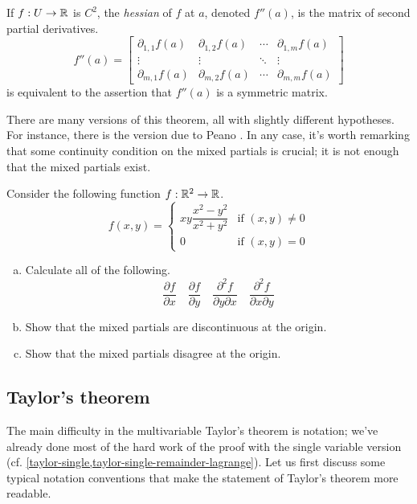 \begin{remark}
	If $f : U \to \mathbb{R}$ is $C^2$, the \emph{hessian} of $f$ at $a$, denoted $f''(a)$, is the matrix of second partial derivatives. 
	\[ f''(a) = \begin{bmatrix} \partial_{1,1} f(a) & \partial_{1,2} f(a) & \dotsb & \partial_{1,m} f(a) \\
	\vdots & \vdots & \ddots & \vdots \\
	\partial_{m,1} f(a) & \partial_{m,2} f(a) & \dotsb & \partial_{m,m} f(a) \end{bmatrix} \]
	 is equivalent to the assertion that $f''(a)$ is a symmetric matrix. 
\end{remark}

There are many versions of this theorem, all with slightly different hypotheses. For instance, there is the version due to Peano \cite[theorem 9.41]{rudin}. In any case, it's worth remarking that some continuity condition on the mixed partials is crucial; it is not enough that the mixed partials exist.

\begin{exercise}
	Consider the following function $f : \mathbb{R}^2 \to \mathbb{R}$. 
	\[ f(x,y) = \begin{cases} xy \dfrac{x^2 - y^2}{x^2 + y^2} & \text{if } (x,y) \neq 0 \\ 0 &  \text{if } (x,y) = 0 \end{cases} \]
	\begin{enumerate}[(a)]
		\item Calculate all of the following. 
		\[ \frac{\partial f}{\partial x} \quad \frac{\partial f}{\partial y} \quad \frac{\partial^2 f}{\partial y \partial x} \quad \frac{\partial^2 f}{\partial x \partial y} \]
		\item Show that the mixed partials are discontinuous at the origin. 
		\item Show that the mixed partials disagree at the origin. 
	\end{enumerate}
\end{exercise}

\subsection{Taylor's theorem \starred} 

The main difficulty in the multivariable Taylor's theorem is notation; we've already done most of the hard work of the proof with the single variable version (cf.  \cref{taylor-single,taylor-single-remainder-lagrange}). Let us first discuss some typical notation conventions that make the statement of Taylor's theorem more readable. 

